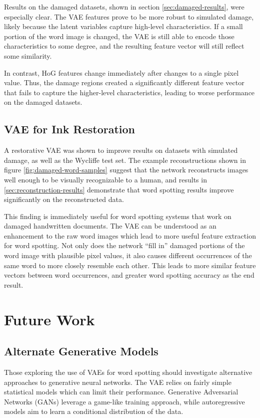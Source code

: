 \documentclass[final]{ukthesis}
\begin{document}
Results on the damaged datasets, shown in section \ref{sec:damaged-results}, were especially clear.  The VAE features prove to be more robust to simulated damage, likely because the latent variables capture high-level characteristics. If a small portion of the word image is changed, the VAE is still able to encode those characteristics to some degree, and the resulting feature vector will still reflect some similarity.

In contrast, HoG features change immediately after changes to a single pixel value. Thus, the damage regions created a significantly different feature vector that fails to capture the higher-level characteristics, leading to worse performance on the damaged datasets.


\subsection{VAE for Ink Restoration}
A restorative VAE was shown to improve results on datasets with simulated damage, as well as the Wycliffe test set. The example reconstructions shown in figure \ref{fig:damaged-word-samples} suggest that the network reconstructs images well enough to be visually recognizable to a human, and results in \ref{sec:reconstruction-results} demonstrate that word spotting results improve significantly on the reconstructed data.

This finding is immediately useful for word spotting systems that work on damaged handwritten documents. The VAE can be understood as an enhancement to the raw word images which lead to more useful feature extraction for word spotting. Not only does the network ``fill in'' damaged portions of the word image with plausible pixel values, it also causes different occurrences of the same word to more closely resemble each other. This leads to more similar feature vectors between word occurrences, and greater word spotting accuracy as the end result.


\section{Future Work}
\subsection{Alternate Generative Models} 
Those exploring the use of VAEs for word spotting should investigate alternative approaches to generative neural networks. The VAE relies on fairly simple statistical models which can limit their performance. Generative Adversarial Networks (GANs) \cite{goodfellow2014generative} leverage a game-like training approach, while autoregressive models \cite{oord2016pixel} aim to learn a conditional distribution of the data.
\end{document}
